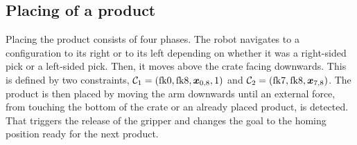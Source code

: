 %

\subsection{Placing of a product}
\label{sub:place}

Placing the product consists of four phases. The robot navigates
to a configuration to its right or to its left depending on
whether it was a right-sided pick or a left-sided pick.
Then, it moves above the crate facing downwards. This is
defined by two constraints, $\mathcal{C}_1 = (\textrm{fk}{0},\textrm{fk}{8},
\bm{x}_{0,8}, 1)$ and $\mathcal{C}_2 = (\textrm{fk}{7},\textrm{fk}{8}, \bm{x}_{7,8})$.
The product is then placed by moving the arm downwards until an
external force, from touching the bottom of the crate
or an already placed product, is detected. That triggers the
release of the gripper and changes the goal to the homing
position ready for the next product.








